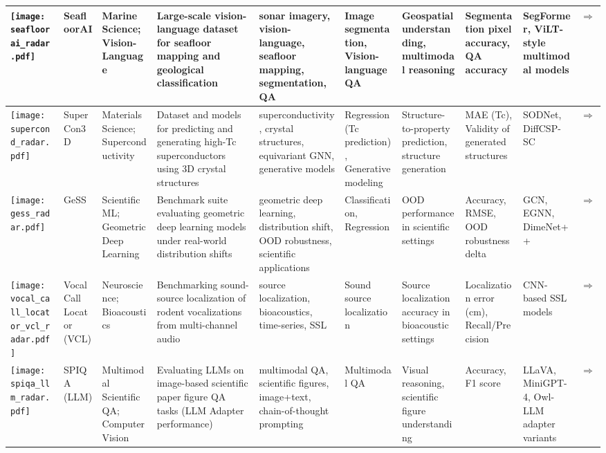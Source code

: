 \begin{landscape}
{\begin{longtable}{|p{}|p{}|p{}|p{}|p{}|p{}|p{}|p{}|p{}|p{}|}
\texttt{[image: seafloorai\_radar.pdf]} & SeafloorAI & Marine Science; Vision-Language & Large-scale vision-language dataset for seafloor mapping and geological classification & sonar imagery, vision-language, seafloor mapping, segmentation, QA & Image segmentation, Vision-language QA & Geospatial understanding, multimodal reasoning & Segmentation pixel accuracy, QA accuracy & SegFormer, ViLT-style multimodal models & \cite{nguyen2024seafloor}\href{https://neurips.cc/virtual/2024/poster/97432}{$\Rightarrow$} \\ \hline
\texttt{[image: supercond\_radar.pdf]} & SuperCon3D & Materials Science; Superconductivity & Dataset and models for predicting and generating high-Tc superconductors using 3D crystal structures & superconductivity, crystal structures, equivariant GNN, generative models & Regression (Tc prediction), Generative modeling & Structure-to-property prediction, structure generation & MAE (Tc), Validity of generated structures & SODNet, DiffCSP-SC & \cite{neurips2024_c4e3b55e}\href{https://neurips.cc/virtual/2024/poster/97553}{$\Rightarrow$} \\ \hline
\texttt{[image: gess\_radar.pdf]} & GeSS & Scientific ML; Geometric Deep Learning & Benchmark suite evaluating geometric deep learning models under real-world distribution shifts & geometric deep learning, distribution shift, OOD robustness, scientific applications & Classification, Regression & OOD performance in scientific settings & Accuracy, RMSE, OOD robustness delta & GCN, EGNN, DimeNet++ & \cite{neurips2024_a8063075}\href{https://neurips.cc/virtual/2024/poster/97816}{$\Rightarrow$} \\ \hline
\texttt{[image: vocal\_call\_locator\_vcl\_radar.pdf]} & Vocal Call Locator (VCL) & Neuroscience; Bioacoustics & Benchmarking sound-source localization of rodent vocalizations from multi-channel audio & source localization, bioacoustics, time-series, SSL & Sound source localization & Source localization accuracy in bioacoustic settings & Localization error (cm), Recall/Precision & CNN-based SSL models & \cite{neurips2024_c00d37d6}\href{https://neurips.cc/virtual/2024/poster/97470}{$\Rightarrow$} \\ \hline
\texttt{[image: spiqa\_llm\_radar.pdf]} & SPIQA (LLM) & Multimodal Scientific QA; Computer Vision & Evaluating LLMs on image-based scientific paper figure QA tasks (LLM Adapter performance) & multimodal QA, scientific figures, image+text, chain-of-thought prompting & Multimodal QA & Visual reasoning, scientific figure understanding & Accuracy, F1 score & LLaVA, MiniGPT-4, Owl-LLM adapter variants & \cite{pramanick2025spiqadatasetmultimodalquestion}\href{https://neurips.cc/virtual/2024/poster/97575}{$\Rightarrow$} \\ \hline

\end{longtable}}
\end{landscape}
